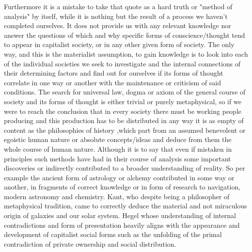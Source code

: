 Furthermore it is a mistake to take that quote as a hard truth or "method of analysis" by itself, while it is nothing but the result of a process we haven't completed ourselves.
 It does not provide us with any relevant knowledge nor answer the questions of which and why specific forms of conscience/thought tend to appear in capitalist society, or in any other given form of society. 
 The only way, and this is the materialist assumption, to gain knowledge is to look into each of the individual societies we seek to investigate and the  internal connections of their determining factors and find out for ourselves if its forms of thought correlate in one way or another with the maintenance or criticism of said conditions.
The search for universal law, dogma or axiom of the general course of society and its forms of thought is either trivial or purely metaphysical, so if we were to reach the conclusion that in every society there must be working people producing and this production has to be distributed in any way it is as empty of content as the philosophies of history
,which part from an assumed benevolent or egoistic human nature or absolute concepts/ideas and deduce from them the whole course of human nature.
Although it is to say that even if mistaken in principles such methods have had in their course of analysis some important discoveries or indirectly contributed to a broader understanding of reality. So per example the ancient form of astrology or alchemy contributed in some way or another, in fragments of correct knowledge or in form of research to navigation, modern astronomy and chemistry.
 Kant, who despite being a philosopher of metaphysical tradition, came to correctly deduce the material and not miraculous origin of galaxies and our solar system. 
 Hegel whose understanding of internal contradictions and form of presentation heavily aligns with the appearance and development of capitalist social forms such as the unfolding of the primal contradiction of private ownership and social distribution.


